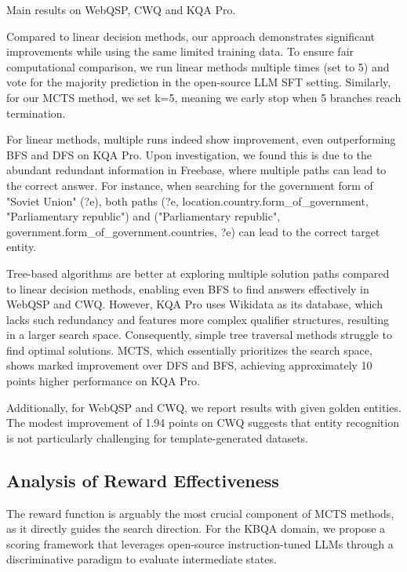 \begin{table*}
{}
\caption{Main results on WebQSP, CWQ and KQA Pro.}
\label{tab:main_results}
\end{table*}

Compared to linear decision methods, our approach demonstrates significant improvements while using the same limited training data. To ensure fair computational comparison, we run linear methods multiple times (set to 5) and vote for the majority prediction in the open-source LLM SFT setting. 
Similarly, for our MCTS method, we set k=5, meaning we early stop when 5 branches reach termination.

For linear methods, multiple runs indeed show improvement, even outperforming BFS and DFS on KQA Pro. Upon investigation, we found this is due to the abundant redundant information in Freebase, where multiple paths can lead to the correct answer. 
For instance, when searching for the government form of "Soviet Union" (?e), both paths (?e, location.country.form\_of\_government, "Parliamentary republic") and ("Parliamentary republic", government.form\_of\_government.countries, ?e) can lead to the correct target entity.

Tree-based algorithms are better at exploring multiple solution paths compared to linear decision methods, enabling even BFS to find answers effectively in WebQSP and CWQ. However, KQA Pro uses Wikidata as its database, which lacks such redundancy and features more complex qualifier structures, resulting in a larger search space. Consequently, simple tree traversal methods struggle to find optimal solutions. MCTS, which essentially prioritizes the search space, shows marked improvement over DFS and BFS, achieving approximately 10 points higher performance on KQA Pro.

Additionally, for WebQSP and CWQ, we report results with given golden entities. The modest improvement of 1.94 points on CWQ suggests that entity recognition is not particularly challenging for template-generated datasets.

\subsection{Analysis of Reward Effectiveness}

The reward function is arguably the most crucial component of MCTS methods, as it directly guides the search direction. 
For the KBQA domain, we propose a scoring framework that leverages open-source instruction-tuned LLMs through a discriminative paradigm to evaluate intermediate states.


